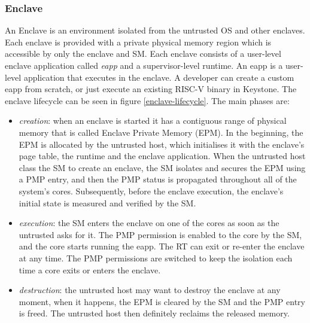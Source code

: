 \subsubsection{Enclave}
An Enclave is an environment isolated from the untrusted OS and other enclaves. Each enclave is provided with a private physical memory region which is accessible by only the enclave and SM. Each enclave consists of a user-level enclave application called \textit{eapp} and a supervisor-level runtime. An eapp is a user-level application that executes in the enclave. A developer can create a custom eapp from scratch, or just execute an existing RISC-V binary in Keystone. The enclave lifecycle can be seen in figure \ref{enclave-lifecycle}. The main phases are:
\begin{itemize}
    \item \textit{creation}: when an enclave is started it has a contiguous range of physical memory that is called Enclave Private Memory (EPM). In the beginning, the EPM is allocated by the untrusted host, which initialises it with the enclave's page table, the runtime and the enclave application. When the untrusted host class the SM to create an enclave, the SM isolates and secures the EPM using a PMP entry, and then the PMP status is propagated throughout all of the system's cores. Subsequently, before the enclave execution, the enclave's initial state is measured and verified by the SM.
    \item \textit{execution}: the SM enters the enclave on one of the cores as soon as the untrusted asks for it. The PMP permission is enabled to the core by the SM, and the core starts running the eapp. The RT can exit or re-enter the enclave at any time. The PMP permissions are switched to keep the isolation each time a core exits or enters the enclave.
    \item \textit{destruction}: the untrusted host may want to destroy the enclave at any moment, when it happens, the EPM is cleared by the SM and the PMP entry is freed. The untrusted host then definitely reclaims the released memory.
\end{itemize}

